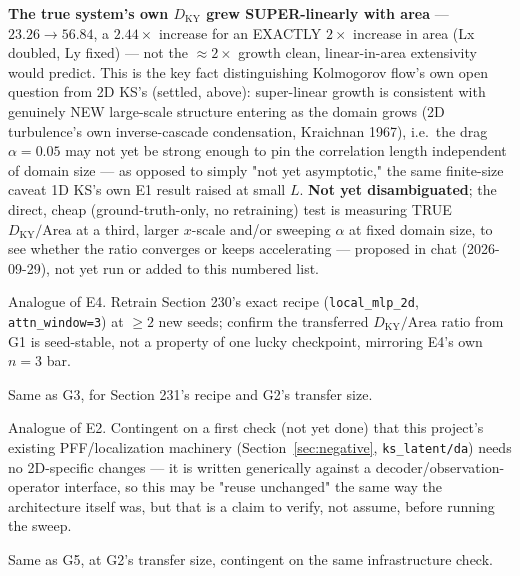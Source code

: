 \documentclass[11pt]{article}
\begin{document}
\begin{description}[style=nextline,leftmargin=1.2em]
\textbf{The true system's own $D_{\mathrm{KY}}$ grew SUPER-linearly with
area} --- $23.26\to56.84$, a $2.44\times$ increase for an EXACTLY
$2\times$ increase in area (Lx doubled, Ly fixed) --- not the
$\approx2\times$ growth clean, linear-in-area extensivity would predict.
This is the key fact distinguishing Kolmogorov flow's own open question
from 2D KS's (settled, above): super-linear growth is consistent with
genuinely NEW large-scale structure entering as the domain grows (2D
turbulence's own inverse-cascade condensation, Kraichnan 1967), i.e.\
the drag $\alpha=0.05$ may not yet be strong enough to pin the
correlation length independent of domain size --- as opposed to simply
"not yet asymptotic," the same finite-size caveat 1D KS's own E1 result
raised at small $L$. \textbf{Not yet disambiguated}; the direct,
cheap (ground-truth-only, no retraining) test is measuring TRUE
$D_{\mathrm{KY}}/\mathrm{Area}$ at a third, larger $x$-scale and/or
sweeping $\alpha$ at fixed domain size, to see whether the ratio
converges or keeps accelerating --- proposed in chat (2026-09-29),
not yet run or added to this numbered list.

\item[G3 --- Seed robustness, 2D KS.] \label{exp:g3}
Analogue of E4. Retrain Section 230's exact recipe (\texttt{local\_mlp\_2d},
\texttt{attn\_window=3}) at $\geq2$ new seeds; confirm the transferred
$D_{\mathrm{KY}}/\mathrm{Area}$ ratio from G1 is seed-stable, not a
property of one lucky checkpoint, mirroring E4's own $n=3$ bar.

\item[G4 --- Seed robustness, Kolmogorov flow.] \label{exp:g4}
Same as G3, for Section 231's recipe and G2's transfer size.

\item[G5 --- DA ensemble-size transfer sweep, 2D KS.] \label{exp:g5}
Analogue of E2. Contingent on a first check (not yet done) that this
project's existing PFF/localization machinery
(Section~\ref{sec:negative}, \texttt{ks\_latent/da}) needs no
2D-specific changes --- it is written generically against a
decoder/observation-operator interface, so this may be "reuse
unchanged" the same way the architecture itself was, but that is a
claim to verify, not assume, before running the sweep.

\item[G6 --- DA ensemble-size transfer sweep, Kolmogorov flow.] \label{exp:g6}
Same as G5, at G2's transfer size, contingent on the same infrastructure
check.


\end{description}
\end{document}
